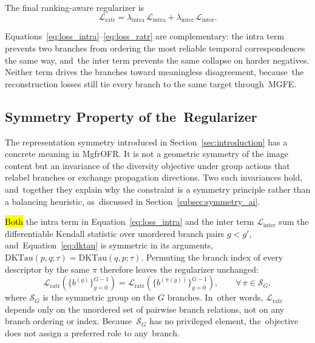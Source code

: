 \documentclass[symmetry,article,accept,pdftex,moreauthors]{Definitions/mdpi}
\begin{document}
The final ranking-aware regularizer is
\begin{equation}
\mathcal{L}_{\text{ratr}} =
\lambda_{\text{intra}}\,\mathcal{L}_{\text{intra}}
+ \lambda_{\text{inter}}\,\mathcal{L}_{\text{inter}}.
\label{eq:loss_ratr}
\end{equation}

Equations~\eqref{eq:loss_intra}--\eqref{eq:loss_ratr} are complementary: the intra term prevents two branches from ordering the most reliable temporal correspondences the same way, and~the inter term prevents the same collapse on harder negatives. Neither term drives the branches toward meaningless disagreement, because~the reconstruction losses still tie every branch to the same target through~MGFE.

\subsection{Symmetry Property of the~Regularizer}
\label{subsec:symmetry_property}

The representation symmetry introduced in Section~\ref{sec:introduction} has a concrete meaning in MgfrOFR. It is not a geometric symmetry of the image content but an invariance of the diversity objective under group actions that relabel branches or exchange propagation directions. Two such invariances hold, and~together they explain why the constraint is a symmetry principle rather than a balancing heuristic, as~discussed in Section~\ref{subsec:symmetry_ai}.

\begin{Property}
\hl{Both} %
 the intra term in Equation~\eqref{eq:loss_intra} and the inter term $\mathcal{L}_{\text{inter}}$ sum the differentiable Kendall statistic over unordered branch pairs $g<g'$, and~Equation~\eqref{eq:dktau} is symmetric in its arguments, $\mathrm{DKTau}(p,q;\tau)=\mathrm{DKTau}(q,p;\tau)$. Permuting the branch index of every descriptor by the same $\pi$ therefore leaves the regularizer unchanged:
\begin{equation}
\mathcal{L}_{\text{ratr}}\!\left(\{b^{(g)}\}_{g=0}^{G-1}\right)
=
\mathcal{L}_{\text{ratr}}\!\left(\{b^{(\pi(g))}\}_{g=0}^{G-1}\right),
\qquad
\forall\,\pi\in\mathcal{S}_G,
\label{eq:branch_permutation}
\end{equation}
where $\mathcal{S}_G$ is the symmetric group on the $G$ branches. In~other words, $\mathcal{L}_{\text{ratr}}$ depends only on the unordered set of pairwise branch relations, not on any branch ordering or index. Because~$\mathcal{S}_G$ has no privileged element, the~objective does not assign a preferred role to any~branch.
\end{Property}
\end{document}
